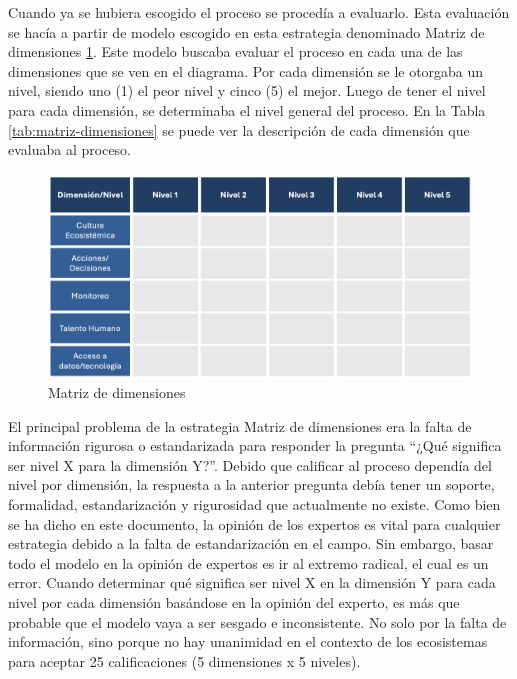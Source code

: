 Cuando ya se hubiera escogido el proceso se procedía a evaluarlo. Esta evaluación se hacía a partir de modelo escogido en esta estrategia denominado Matriz de dimensiones \ref{fig:matriz-dimensiones}. Este modelo buscaba evaluar el proceso en cada una de las dimensiones que se ven en el diagrama. Por cada dimensión se le otorgaba un nivel, siendo uno (1) el peor nivel y cinco (5) el mejor. Luego de tener el nivel para cada dimensión, se determinaba el nivel general del proceso. En la Tabla \ref{tab:matriz-dimensiones} se puede ver la descripción de cada dimensión que evaluaba al proceso.

\begin{figure}[H]
    \centering
    \includegraphics[scale=0.4]{images/4-desarrollo/matriz-dimensiones.png}
    \caption{Matriz de dimensiones}
    \label{fig:matriz-dimensiones}
\end{figure}



El principal problema de la estrategia Matriz de dimensiones era la falta de información rigurosa o estandarizada para responder la pregunta “¿Qué significa ser nivel X para la dimensión Y?”.  Debido que calificar al proceso dependía del nivel por dimensión, la respuesta a la anterior pregunta debía tener un soporte, formalidad, estandarización y rigurosidad que actualmente no existe. Como bien se ha dicho en este documento, la opinión de los expertos es vital para cualquier estrategia debido a la falta de estandarización en el campo. Sin embargo, basar todo el modelo en la opinión de expertos es ir al extremo radical, el cual es un error. Cuando determinar qué significa ser nivel X en la dimensión Y para cada nivel por cada dimensión basándose en la opinión del experto, es más que probable que el modelo vaya a ser sesgado e inconsistente. No solo por la falta de información, sino porque no hay unanimidad en el contexto de los ecosistemas para aceptar 25 calificaciones (5 dimensiones x 5 niveles).

